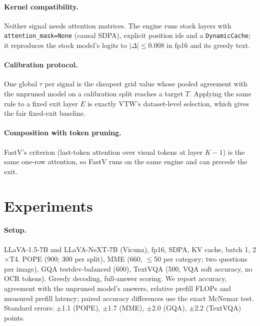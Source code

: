 \documentclass[10pt]{article}
\begin{document}
\paragraph{Kernel compatibility.} Neither signal needs attention matrices. The engine runs stock layers with
\texttt{attention\_mask=None} (causal SDPA), explicit position ids and a \texttt{DynamicCache}; it reproduces the stock
model's logits to $|\Delta| \le 0.008$ in fp16 and its greedy text.
\paragraph{Calibration protocol.} One global $\tau$ per signal is the cheapest grid value whose pooled agreement with
the unpruned model on a calibration split reaches a target $T$. Applying the same rule to a fixed exit layer $E$ is
exactly VTW's dataset-level selection, which gives the fair fixed-exit baseline.
\paragraph{Composition with token pruning.} FastV's criterion (last-token attention over visual tokens at layer $K-1$)
is the same one-row attention, so FastV runs on the same engine and can precede the exit.

\section{Experiments}
\label{sec:exp}
\paragraph{Setup.} LLaVA-1.5-7B and LLaVA-NeXT-7B (Vicuna), fp16, SDPA, KV cache, batch 1, 2$\times$T4. POPE (900;
300 per split), MME (660, $\le$50 per category; two questions per image), GQA testdev-balanced (600), TextVQA (500, VQA
soft accuracy, no OCR tokens). Greedy decoding, full-answer scoring. We report accuracy, agreement with the unpruned
model's answers, relative prefill FLOPs and measured prefill latency; paired accuracy differences use the exact McNemar
test. Standard errors: $\pm$1.1 (POPE), $\pm$1.7 (MME), $\pm$2.0 (GQA), $\pm$2.2 (TextVQA) points.
\end{document}
